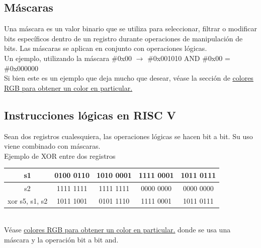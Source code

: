 \documentclass[10pt,a4paper]{article}
\begin{document}
\subsection*{Máscaras}
Una máscara es un valor binario que se utiliza para seleccionar, filtrar o modificar bits específicos dentro de un registro durante operaciones de manipulación de bits. Las máscaras se aplican en conjunto con operaciones lógicas. \\

Un ejemplo, utilizando la máscara \#0x00 $\rightarrow$ \#0x001010 AND \#0x00 = \#0x000000 \\

Si bien este es un ejemplo que deja mucho que desear, véase la sección de \hyperref[subsec:byte_particular_desplazamiento]{\underline{colores RGB para obtener un color en particular.}}
\subsection*{Instrucciones lógicas en RISC V}
Sean dos registros cualesquiera, las operaciones lógicas se hacen bit a bit. Su uso viene combinado con máscaras. \\
Ejemplo de XOR entre dos registros
\begin{table}[h!]
    \centering
    \begin{tabular}{|c | c | c | c| c|}
    \hline
    s1 & 0100 0110 & 1010 0001 & 1111 0001 & 1011 0111 \\ \hline
    s2 & 1111 1111 & 1111 1111 & 0000 0000 & 0000 0000 \\ \hline
    xor s5, s1, s2 & 1011 1001 & 0101 1110 & 1111 0001 & 1011 0111 \\
    \hline
    \end{tabular}
    \label{tab:xor}
\end{table} 
\\
Véase \hyperref[subsec:byte_particular_desplazamiento]{\underline{colores RGB para obtener un color en particular.}} donde se usa una máscara y la operación bit a bit and.
\end{document}
